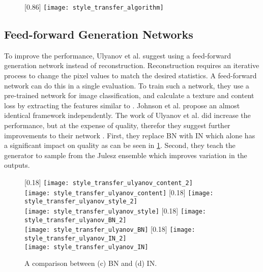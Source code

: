 \begin{figure}[h]
	\centering
	\captionsetup{justification=centering}
	[0.86\textwidth]{
		\texttt{[image: style\_transfer\_algorithm]}
	}
\end{figure}

\subsection{Feed-forward Generation Networks}
To improve the performance, Ulyanov et al. \cite{Ulyanov2016} suggest using a feed-forward generation network instead of reconstruction.
Reconstruction requires an iterative process to change the pixel values to match the desired statistics.
A feed-forward network can do this in a single evaluation.
To train such a network, they use a pre-trained network for image classification, and calculate a texture and content loss by extracting the features similar to \cite{Gatys2016}.
Johnson et al. \cite{Johnson2016} propose an almost identical framework independently.
The work of Ulyanov et al. did increase the performance, but at the expense of quality, therefor they suggest further improvements to their network \cite{Ulyanov2017}.
First, they replace \gls{BN} \cite{Ioffe2015} with \gls{IN} which alone has a significant impact on quality as can be seen in \ref{fig:style_transfer_ulyanov_BN_IN_comparison}.
Second, they teach the generator to sample from the Julesz ensemble \cite{Zhu2000} which improves variation in the outputs.
\\

\begin{figure}[h]
	\centering
	[0.18\textwidth]{%
		\texttt{[image: style\_transfer\_ulyanov\_content\_2]}\\
		\texttt{[image: style\_transfer\_ulyanov\_content]}%
	}
	[0.18\textwidth]{%
		\texttt{[image: style\_transfer\_ulyanov\_style\_2]}\\
		\texttt{[image: style\_transfer\_ulyanov\_style]}%
	}
	[0.18\textwidth]{%
		\texttt{[image: style\_transfer\_ulyanov\_BN\_2]}\\
		\texttt{[image: style\_transfer\_ulyanov\_BN]}%
	}
	[0.18\textwidth]{%
		\texttt{[image: style\_transfer\_ulyanov\_IN\_2]}\\
		\texttt{[image: style\_transfer\_ulyanov\_IN]}%
	}
	\caption{A comparison between (c) BN and (d) IN.\cite{Ulyanov2017}}
	\label{fig:style_transfer_ulyanov_BN_IN_comparison}
\end{figure}

